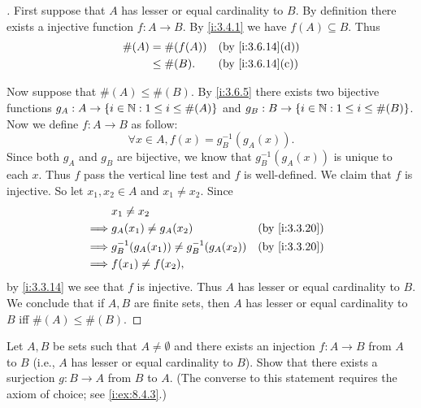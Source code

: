 \begin{proof}[]
  First suppose that \(A\) has lesser or equal cardinality to \(B\).
  By definition there exists a injective function \(f : A \to B\).
  By \cref{i:3.4.1} we have \(f(A) \subseteq B\).
  Thus
  \begin{align*}
    \#(A) & = \#(f(A))  &  & \by{i:3.6.14}[d] \\
          & \leq \#(B). &  & \by{i:3.6.14}[c]
  \end{align*}

  Now suppose that \(\#(A) \leq \#(B)\).
  By \cref{i:3.6.5} there exists two bijective functions \(g_A : A \to \left\lbrace i \in \mathbb{N} : 1 \leq i \leq \#(A)\right\rbrace\) and \(g_B : B \to \left\lbrace i \in \mathbb{N} : 1 \leq i \leq \#(B)\right\rbrace\).
  Now we define \(f : A \to B\) as follow:
  \[
    \forall x \in A, f(x) = g_B^{-1}(g_A(x)).
  \]
  Since both \(g_A\) and \(g_B\) are bijective, we know that \(g_B^{-1}(g_A(x))\) is unique to each \(x\).
  Thus \(f\) pass the vertical line test and \(f\) is well-defined.
  We claim that \(f\) is injective.
  So let \(x_1, x_2 \in A\) and \(x_1 \neq x_2\).
  Since
  \begin{align*}
             & x_1 \neq x_2                                                  \\
    \implies & g_A(x_1) \neq g_A(x_2)                     &  & \by{i:3.3.20} \\
    \implies & g_B^{-1}(g_A(x_1)) \neq g_B^{-1}(g_A(x_2)) &  & \by{i:3.3.20} \\
    \implies & f(x_1) \neq f(x_2),
  \end{align*}
  by \cref{i:3.3.14} we see that \(f\) is injective.
  Thus \(A\) has lesser or equal cardinality to \(B\).
  We conclude that if \(A, B\) are finite sets, then \(A\) has lesser or equal cardinality to \(B\) iff \(\#(A) \leq \#(B)\).
\end{proof}

\begin{ex}\label{i:ex:3.6.8}
  Let \(A, B\) be sets such that \(A \neq \emptyset\) and there exists an injection \(f : A \to B\) from \(A\) to \(B\) (i.e., \(A\) has lesser or equal cardinality to \(B\)).
  Show that there exists a surjection \(g : B \to A\) from \(B\) to \(A\).
  (The converse to this statement requires the axiom of choice;
  see \cref{i:ex:8.4.3}.)
\end{ex}

